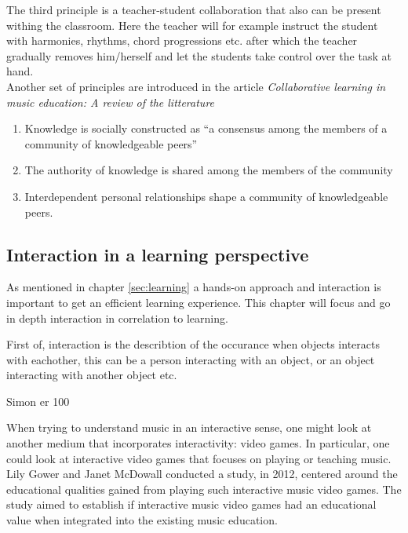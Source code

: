 	The third principle is a teacher-student collaboration that also can be present withing the classroom. Here the teacher will for example instruct the student with harmonies, rhythms, chord progressions etc. after which the teacher gradually removes him/herself and let the students take control over the task at hand.\\
	
	Another set of principles are introduced in the article \textit{Collaborative learning in music education: A review of the litterature}\cite{collaborativeLearningReview}\\

	\begin{enumerate}
		\item Knowledge is socially constructed as “a consensus among the members of a community of knowledgeable peers”
		\item The authority of knowledge is shared among the members of the community                                                           
		\item Interdependent personal relationships shape a community
		of knowledgeable peers.
	\end{enumerate}
	

	\subsection{Interaction in a learning perspective}
	As mentioned in chapter \ref{sec:learning} a hands-on approach and interaction is important to get an efficient learning experience. This chapter will focus and go in depth interaction in correlation to learning.
	
	First of, interaction is the describtion of the occurance when objects interacts with eachother, this can be a person interacting with an object, or an object interacting with another object etc.
	
	Simon er 100%
	
When trying to understand music in an interactive sense, one might look at another medium that incorporates interactivity: video games. In particular, one could look at interactive video games that focuses on playing or teaching music. Lily Gower and Janet McDowall conducted a study, in 2012, centered around the educational qualities gained from playing such interactive music video games\cite{interactiveMusicVideoGames}. The study aimed to establish if interactive music video games had an educational value when integrated into the existing music education.\\

